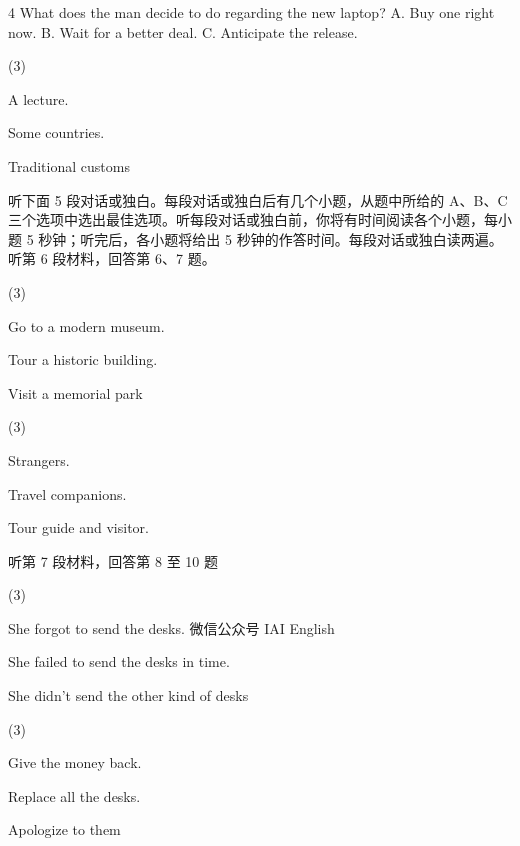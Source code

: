 \documentclass{英语试卷}
\begin{document}
\par 4 What does the man decide to do regarding the new laptop? A. Buy one right now. B. Wait for a better deal. C. Anticipate the release.\par
{}
\begin{choices}(3)
  \item A lecture.
  \item Some countries.
  \item Traditional customs
\end{choices}
\par 听下面 5 段对话或独白。每段对话或独白后有几个小题，从题中所给的 A、B、C 三个选项中选出最佳选项。听每段对话或独白前，你将有时间阅读各个小题，每小题 5 秒钟；听完后，各小题将给出 5 秒钟的作答时间。每段对话或独白读两遍。 听第 6 段材料，回答第 6、7 题。\par
{}
\begin{choices}(3)
  \item Go to a modern museum.
  \item Tour a historic building.
  \item Visit a memorial park
\end{choices}
\begin{choices}(3)
  \item Strangers.
  \item Travel companions.
  \item Tour guide and visitor.
\end{choices}
\par 听第 7 段材料，回答第 8 至 10 题\par
{}
\begin{choices}(3)
  \item She forgot to send the desks. 微信公众号 IAI English
  \item She failed to send the desks in time.
  \item She didn't send the other kind of desks
\end{choices}
\begin{choices}(3)
  \item Give the money back.
  \item Replace all the desks.
  \item Apologize to them
\end{choices}
\end{document}
